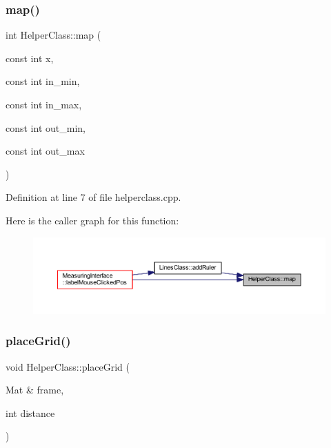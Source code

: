 \subsubsection{\texorpdfstring{map()}{map()}}
{\footnotesize\ttfamily int Helper\+Class\+::map (\begin{DoxyParamCaption}\item[{const int}]{x,  }\item[{const int}]{in\+\_\+min,  }\item[{const int}]{in\+\_\+max,  }\item[{const int}]{out\+\_\+min,  }\item[{const int}]{out\+\_\+max }\end{DoxyParamCaption})\hspace{0.3cm}{\ttfamily [static]}}



Definition at line 7 of file helperclass.\+cpp.

Here is the caller graph for this function\+:\nopagebreak
\begin{figure}[H]
\begin{center}
\leavevmode
\includegraphics[width=350pt]{class_helper_class_a527b26e649e561032d957ce26beb922e_icgraph}
\end{center}
\end{figure}
\mbox{\label{class_helper_class_a2628c0f86fb5959325f6aa4272b6f210}} 
\subsubsection{\texorpdfstring{placeGrid()}{placeGrid()}}
{\footnotesize\ttfamily void Helper\+Class\+::place\+Grid (\begin{DoxyParamCaption}\item[{Mat \&}]{frame,  }\item[{int}]{distance }\end{DoxyParamCaption})\hspace{0.3cm}{\ttfamily [static]}}



